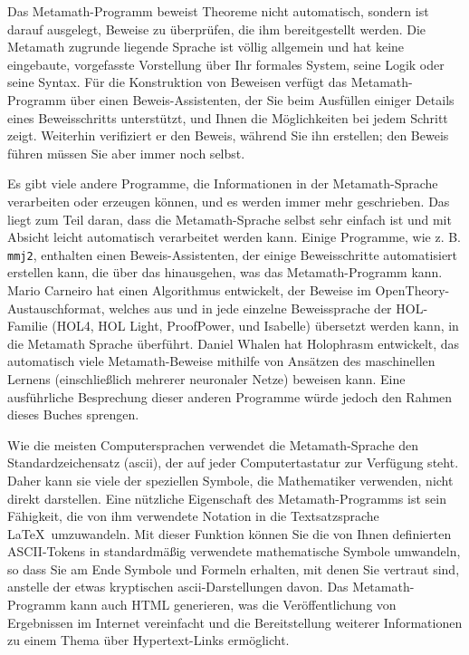 Das Metamath-Programm beweist Theoreme nicht automatisch, sondern ist darauf ausgelegt, Beweise zu überprüfen, die ihm bereitgestellt werden.
Die Metamath zugrunde liegende Sprache ist völlig allgemein und hat keine eingebaute, vorgefasste Vorstellung über Ihr formales System, seine Logik oder seine Syntax.
Für die Konstruktion von Beweisen verfügt das Metamath-Programm über einen Beweis-Assistenten, der Sie beim Ausfüllen einiger Details eines Beweisschritts unterstützt, und Ihnen die Möglichkeiten bei jedem Schritt zeigt.
Weiterhin verifiziert er den Beweis, während Sie ihn erstellen; den Beweis führen müssen Sie aber immer noch selbst.

Es gibt viele andere Programme, die Informationen in der Metamath-Sprache verarbeiten oder erzeugen können, und es werden immer mehr geschrieben. Das liegt zum Teil daran, dass die Metamath-Sprache selbst sehr einfach ist und mit Absicht leicht automatisch verarbeitet werden kann.
Einige Programme, wie z. B. \texttt{mmj2}, enthalten einen Beweis-Assistenten, der einige Beweisschritte automatisiert erstellen kann, die über das hinausgehen, was das Metamath-Programm kann.
Mario Carneiro hat einen Algorithmus entwickelt, der Beweise im OpenTheory-Austauschformat, welches aus und in jede einzelne Beweissprache der HOL-Familie (HOL4, HOL Light, ProofPower, und Isabelle) übersetzt werden kann, in die Metamath Sprache \cite{DBLP:journals/corr/Carneiro14} überführt.
Daniel Whalen hat Holophrasm entwickelt, das automatisch viele Metamath-Beweise mithilfe von Ansätzen des maschinellen Lernens (einschließlich mehrerer neuronaler Netze) beweisen kann\cite{DBLP:journals/corr/Whalen16}.
Eine ausführliche Besprechung dieser anderen Programme würde jedoch den Rahmen dieses Buches sprengen.

Wie die meisten Computersprachen verwendet die Metamath-Sprache den
Standardzeichensatz ({\sc ascii}), der auf jeder Computertastatur zur Verfügung steht. Daher kann sie viele der speziellen Symbole, die Mathematiker verwenden, nicht direkt darstellen. 
Eine nützliche Eigenschaft des Metamath-Programms ist sein Fähigkeit, die von ihm verwendete Notation in die Textsatzsprache \LaTeX\ umzuwandeln.
Mit dieser Funktion können Sie die von Ihnen definierten ASCII-Tokens in standardmäßig verwendete mathematische Symbole umwandeln, so dass Sie am Ende Symbole und Formeln erhalten, mit denen Sie vertraut sind, anstelle der etwas kryptischen {\sc ascii}-Darstellungen davon.
Das Metamath-Programm kann auch HTML generieren, was die Veröffentlichung von Ergebnissen im Internet vereinfacht und die Bereitstellung weiterer Informationen zu einem Thema über Hypertext-Links ermöglicht.

